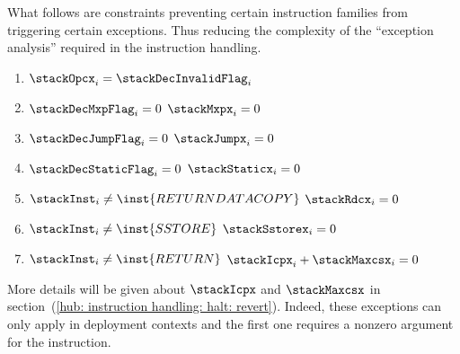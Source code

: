 \begin{center}
\end{center}
What follows are constraints preventing certain instruction families from triggering certain exceptions.
Thus reducing the complexity of the ``exception analysis'' required in the instruction handling.
\begin{enumerate}
	\item $\stackOpcx _{i} = \stackDecInvalidFlag _{i}$
	\item \If $\stackDecMxpFlag    _{i} = 0$ \Then $\stackMxpx    _{i} = 0$
	\item \If $\stackDecJumpFlag   _{i} = 0$ \Then $\stackJumpx   _{i} = 0$
	\item \If $\stackDecStaticFlag _{i} = 0$ \Then $\stackStaticx _{i} = 0$
	\item \If $\stackInst _{i} \neq \inst{RETURNDATACOPY}$ \Then $ \stackRdcx    _{i} = 0 $
	\item \If $\stackInst _{i} \neq \inst{SSTORE}$         \Then $ \stackSstorex _{i} = 0 $
	\item \If $\stackInst _{i} \neq \inst{RETURN}$         \Then $ \stackIcpx    _{i} + \stackMaxcsx _{i} = 0 $
\end{enumerate}
\saNote{}
More details will be given about $\stackIcpx$ and $\stackMaxcsx$ in section~(\ref{hub: instruction handling: halt: revert}). 
Indeed, these exceptions can only apply in deployment contexts and the first one requires a nonzero  argument for the  instruction. 
